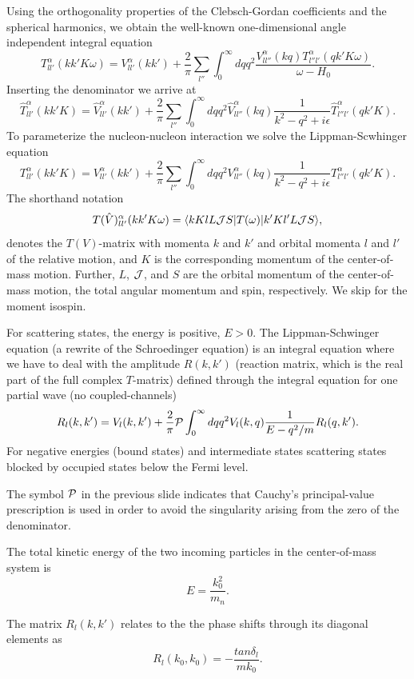 \documentclass[%
oneside,                 %
final,                   %
10pt]{article}
\begin{document}
Using the orthogonality
properties of the Clebsch-Gordan coefficients and the spherical harmonics,
we obtain the well-known
one-dimensional angle independent
integral equation
\[
   T_{ll'}^{\alpha}(kk'K\omega)=V_{ll'}^{\alpha}(kk')
   +\frac{2}{\pi}\sum_{l''}\int_{0}^{\infty} dqq^2
   \frac{V_{ll''}^{\alpha}(kq)
   T_{l''l'}^{\alpha}(qk'K\omega)}
   {\omega -H_0}.
\]
Inserting the denominator we arrive at 
\[
   \hat{T}_{ll'}^{\alpha}(kk'K)=\hat{V}_{ll'}^{\alpha}(kk')
   +\frac{2}{\pi}\sum_{l''}\int_{0}^{\infty} dqq^2
   \hat{V}_{ll''}^{\alpha}(kq)
   \frac{1}{k^2-q^2 +i\epsilon}
   \hat{T}_{l''l'}^{\alpha}(qk'K).
\]
To parameterize the nucleon-nucleon interaction we solve the Lippman-Scwhinger
equation
\[
   T_{ll'}^{\alpha}(kk'K)=V_{ll'}^{\alpha}(kk')
   +\frac{2}{\pi}\sum_{l''}\int_{0}^{\infty} dqq^2
   V_{ll''}^{\alpha}(kq)
   \frac{1}{k^2-q^2 +i\epsilon}
   T_{l''l'}^{\alpha}(qk'K).
\]
The  shorthand notation
\[
    T(\hat{V})_{ll'}^{\alpha}(kk'K\omega)=\langle kKlL{\cal J}S\vert T(\omega)\vert k'Kl'L{\cal J}S\rangle,
\]
denotes the $T(V)$-matrix
with momenta $k$ and $k'$ and orbital momenta $l$ and $l'$
of the relative motion, and
$K$ is the corresponding momentum of
the center-of-mass motion. Further, $L$, ${\cal J}$, and $S$
are the orbital momentum of the center-of-mass motion, the
total angular momentum and
spin, respectively. We skip for the moment isospin.

For scattering states, the energy is positive, $E>0$. 
The Lippman-Schwinger equation (a rewrite of the Schroedinger equation)
is an integral equation
where we have to deal with the amplitude 
$R(k,k')$ (reaction matrix, which is the real part of  the full
complex $T$-matrix)
defined through the integral equation for one partial wave (no coupled-channels) 
\begin{equation}
    R_l(k,k') = V_l(k,k') +\frac{2}{\pi}{\cal P}
                \int_0^{\infty}dqq^2V_l(k,q)\frac{1}{E-q^2/m}R_l(q,k').
   \label{eq:ls1}
\end{equation}
For negative energies (bound states) and intermediate states scattering states blocked
by  occupied states below the Fermi level.

The symbol ${\cal P}$ in the previous slide indicates that Cauchy's principal-value prescription
is used in order to avoid the singularity arising from the zero of the denominator.


The total kinetic energy of the two 
incoming particles in the center-of-mass system
is 
\[
    E=\frac{k_0^2}{m_n}.
\]

The matrix $R_l(k,k')$ relates to the 
the  phase shifts through its diagonal elements as
\begin{equation}
     R_l(k_0,k_0)=-\frac{tan\delta_l}{mk_0}.
     \label{eq:shifts}
\end{equation}
\end{document}
